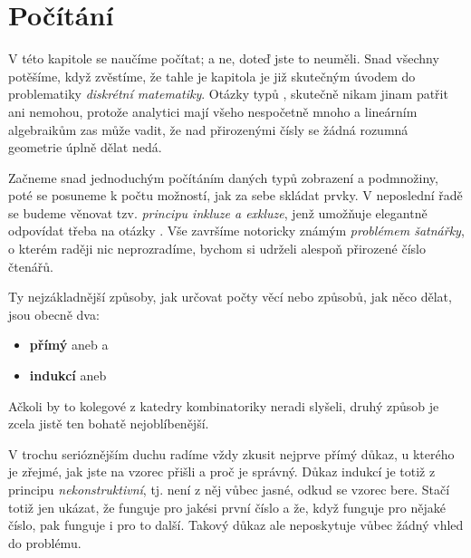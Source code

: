 \section{Počítání}
\label{sec:pocitani}

V této kapitole se naučíme počítat; a ne, doteď jste to neuměli. Snad všechny
potěšíme, když zvěstíme, že tahle je kapitola je již skutečným úvodem do
problematiky \emph{diskrétní matematiky}. Otázky typů ,
 skutečně nikam jinam patřit ani nemohou,
protože analytici mají všeho nespočetně mnoho a lineárním algebraikům zas může
vadit, že nad přirozenými čísly se žádná rozumná geometrie úplně dělat nedá.

Začneme snad jednoduchým počítáním daných typů zobrazení a podmnožiny, poté se
posuneme k počtu možností, jak za sebe skládat prvky. V neposlední řadě se
budeme věnovat tzv. \emph{principu inkluze a exkluze}, jenž umožňuje elegantně
odpovídat třeba na otázky . Vše završíme notoricky známým \emph{problémem šatnářky}, o
kterém raději nic neprozradíme, bychom si udrželi alespoň přirozené číslo
čtenářů.

Ty nejzákladnější způsoby, jak určovat počty věcí nebo způsobů, jak něco dělat,
jsou obecně dva:
\begin{itemize}
 \item \textbf{přímý} aneb  a
 \item \textbf{indukcí} aneb 
\end{itemize}
Ačkoli by to kolegové z katedry kombinatoriky neradi slyšeli, druhý způsob je
zcela jistě ten bohatě nejoblíbenější.

V trochu serióznějším duchu radíme vždy zkusit nejprve přímý důkaz, u kterého je
zřejmé, jak jste na vzorec přišli a proč je správný. Důkaz indukcí je totiž z
principu \emph{nekonstruktivní}, tj. není z něj vůbec jasné, odkud se vzorec
bere. Stačí totiž jen ukázat, že funguje pro jakési první číslo a že, když
funguje pro nějaké číslo, pak funguje i pro to další. Takový důkaz ale
neposkytuje vůbec žádný vhled do problému.


